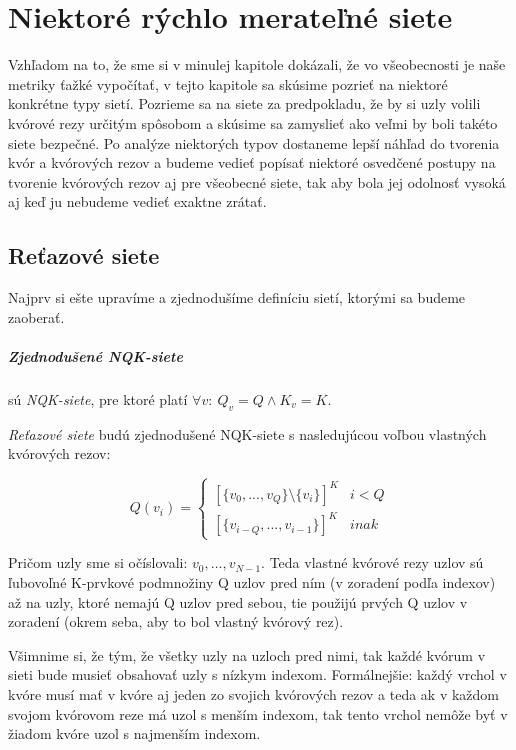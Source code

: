 \chapter{Niektoré rýchlo merateľné siete}

Vzhľadom na to, že sme si v minulej kapitole dokázali, že vo všeobecnosti
je naše metriky ťažké vypočítať, v tejto kapitole sa skúsime pozrieť na niektoré
konkrétne typy sietí. Pozrieme sa na siete za predpokladu, že by si uzly volili
kvórové rezy určitým spôsobom a skúsime sa zamyslieť ako veľmi by boli takéto
siete bezpečné.
Po analýze niektorých typov dostaneme lepší náhľad do tvorenia kvór a
kvórových rezov a budeme vedieť popísať niektoré osvedčené postupy na tvorenie
kvórových rezov aj pre všeobecné siete, tak aby bola jej odolnosť vysoká
aj keď ju nebudeme vedieť exaktne zrátať.

\section {Reťazové siete}

Najprv si ešte upravíme a zjednodušíme definíciu sietí, ktorými sa budeme zaoberať.

\paragraph{Zjednodušené NQK-siete} sú \textit{NQK-siete}, pre ktoré platí
$\forall v:\:Q_v=Q\land K_v=K$.

\vspace{3mm}
\textit{Reťazové siete} budú zjednodušené NQK-siete s nasledujúcou voľbou
vlastných kvórových rezov:

$$Q(v_i)= \begin{cases}
            [\{v_0, ..., v_Q\} \setminus \{v_i\}]^K & i < Q \\
            [\{v_{i-Q}, ..., v_{i-1}\}]^K & inak
          \end{cases}$$

Pričom uzly sme si očíslovali: $v_0, ..., v_{N-1}$.
Teda vlastné kvórové rezy uzlov sú ľubovoľné K-prvkové podmnožiny Q uzlov pred ním
(v zoradení podľa indexov) až na uzly, ktoré nemajú Q uzlov pred sebou, tie
použijú prvých Q uzlov v zoradení (okrem seba, aby to bol vlastný kvórový rez).

Všimnime si, že tým, že všetky uzly  na uzloch pred nimi, tak
každé kvórum v sieti bude musieť obsahovať uzly s nízkym indexom.
Formálnejšie:
každý vrchol v kvóre musí mať v kvóre aj jeden zo svojich kvórových rezov
a teda ak v každom svojom kvórovom reze má uzol s menším indexom, tak
tento vrchol nemôže byť v žiadom kvóre uzol s najmenším indexom.


